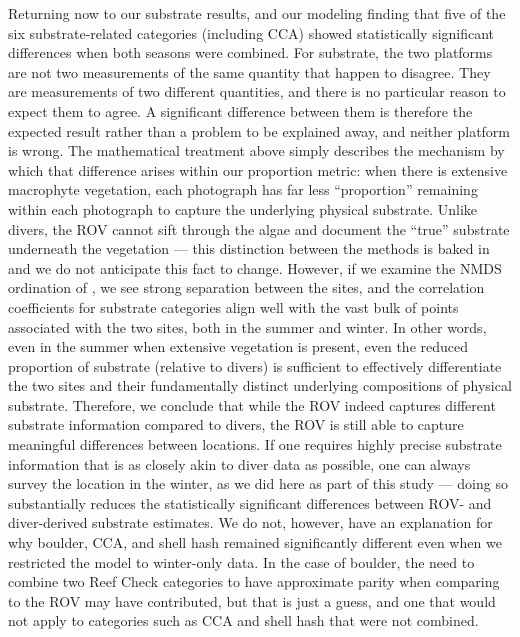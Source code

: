 \documentclass[11pt]{article}
\newcommand{\boxedref}[2]{%
	\begingroup
	\setlength{\fboxrule}{0.8pt}%
	\setlength{\fboxsep}{1.5pt}%
	\textcolor{linkcyan}{%
		\fbox{%
			\textcolor{black}{%
				\hyperref[#2]{#1~\ref*{#2}}%
			}%
		}%
	}%
	\endgroup
}
\newcommand{\figref}[1]{\boxedref{Fig.}{#1}}\newcommand{\tabref}[1]{\boxedref{Table}{#1}}
\begin{document}
Returning now to our substrate results, and our modeling finding that five of
the six substrate-related categories (including CCA) showed statistically
significant differences when both seasons were combined.
For substrate, the two platforms are not two measurements of the same quantity 
that happen to disagree.
They are measurements of two different quantities, and there is no particular
reason to expect them to agree.
A significant difference between them is therefore the expected result rather
than a problem to be explained away, and neither platform is wrong.
The mathematical treatment above simply describes the mechanism by which that
difference arises within our proportion metric: when there is extensive
macrophyte vegetation, each photograph has far less
``proportion'' remaining within each photograph to capture the underlying
physical substrate.
Unlike divers, the ROV cannot sift through the algae and document the ``true''
substrate underneath the vegetation --- this distinction between the methods is
baked in and we do not anticipate this fact to change.
However, if we examine the NMDS ordination of \figref{fig:NMDS}, we see strong
separation between the sites, and the correlation coefficients for substrate
categories align well with the vast bulk of points associated with the two
sites, both in the summer and winter.
In other words, even in the summer when extensive vegetation is present, even 
the reduced proportion of substrate (relative to divers) is sufficient to 
effectively differentiate the two sites and their fundamentally distinct 
underlying compositions of physical substrate. 
Therefore, we conclude that while the ROV indeed captures different substrate
information compared to divers, the ROV is still able to capture meaningful
differences between locations.
If one requires highly precise substrate information that is as 
closely akin to diver data as possible, one can always survey the location in 
the winter, as we did here as part of this study --- doing so substantially reduces the 
statistically significant differences between ROV- and diver-derived 
substrate estimates.
We do not, however, have an explanation for why boulder, CCA, and shell hash
remained significantly different even when we restricted the model to
winter-only data.
In the case of boulder, the need to combine two Reef Check categories to have
approximate parity when comparing to the ROV may have contributed, but that is
just a guess, and one that would not apply to categories such as CCA and shell
hash that were not combined.
\end{document}
